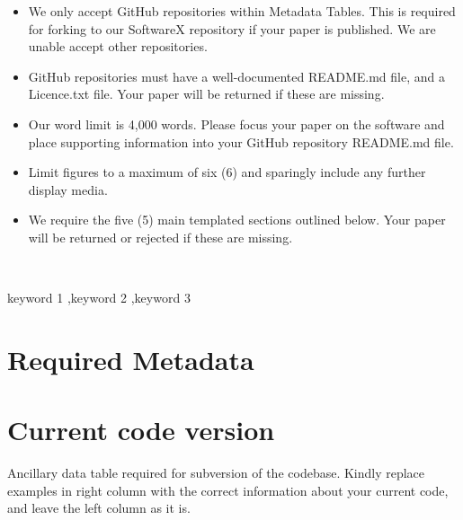 \documentclass[preprint,12pt, a4paper]{elsarticle}
\begin{document}
\begin{frontmatter}
\begin{itemize}
    
    \begin{itemize} 
    	\item We only accept GitHub repositories within Metadata Tables. This is required for forking to our SoftwareX repository if your paper is published. We are unable accept other repositories.
        \item GitHub repositories must have a well-documented README.md file, and a Licence.txt file. Your paper will be returned if these are missing.
        \item Our word limit is 4,000 words. Please focus your paper on the software and place supporting information into your GitHub repository README.md file.
        \item Limit figures to a maximum of six (6) and sparingly include any further display media.
        \item We require the five (5) main templated sections outlined below. Your paper will be returned or rejected if these are missing.
	\end{itemize}
\end{itemize}\\

\begin{abstract}
Ca. 100 words

\end{abstract}

\begin{keyword}
keyword 1 \sep keyword 2 \sep keyword 3



\end{keyword}

\end{frontmatter}


\section*{Required Metadata}
\label{}

\section*{Current code version}
\label{}

Ancillary data table required for subversion of the codebase. Kindly replace examples in right column with the correct information about your current code, and leave the left column as it is.
\end{document}
